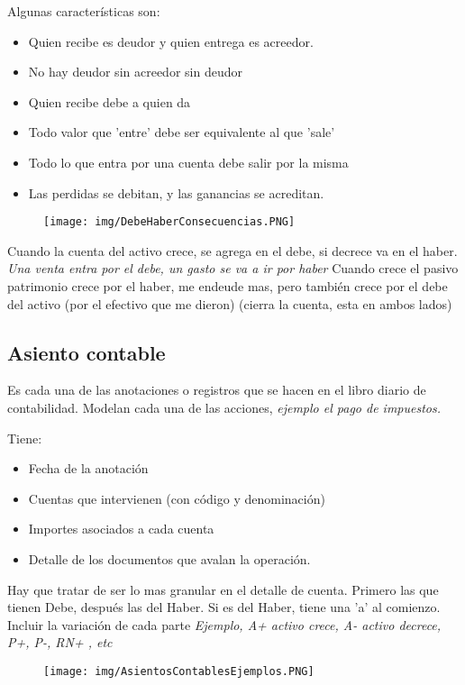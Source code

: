 \documentclass[titlepage,a4paper]{article}
\begin{document}
Algunas características son:
\begin{itemize}
\item Quien recibe es deudor y quien entrega es acreedor.
\item No hay deudor sin acreedor sin deudor
\item Quien recibe debe a quien da
\item Todo valor que 'entre' debe ser equivalente al que 'sale'
\item Todo lo que entra por una cuenta debe salir por la misma
\item Las perdidas se debitan, y las ganancias se acreditan.
\end{itemize}

\begin{figure}[!htb]
    \centering
    \texttt{[image: img/DebeHaberConsecuencias.PNG]}
\end{figure}

Cuando la cuenta del activo crece, se agrega en el debe, si decrece va en el haber. \textit{Una venta entra por el debe, un gasto se va a ir por haber}
Cuando crece el pasivo patrimonio crece por el haber, me endeude mas, pero también crece por el debe del activo (por el efectivo que me dieron) (cierra la cuenta, esta en ambos lados)

\subsection{Asiento contable}
Es cada una de las anotaciones o registros que se hacen en el libro diario de contabilidad. Modelan cada una de las acciones, \textit{ejemplo el pago de impuestos.}

Tiene:
\begin{itemize}
\item Fecha de la anotación
\item Cuentas que intervienen (con código y denominación)
\item Importes asociados a cada cuenta
\item Detalle de los documentos que avalan la operación.
\end{itemize}


Hay que tratar de ser lo mas granular en el detalle de cuenta.
Primero las que tienen Debe, después las del Haber.
Si es del Haber, tiene una 'a' al comienzo.
Incluir la variación de cada parte \textit{Ejemplo, A+ activo crece, A- activo decrece, P+, P-, RN+ , etc}


\begin{figure}[!htb]
    \centering
    \texttt{[image: img/AsientosContablesEjemplos.PNG]}
\end{figure}
\end{document}
